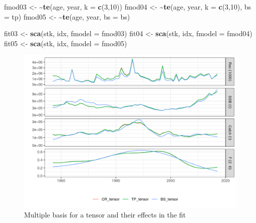 \documentclass[
]{book}
\newenvironment{Shaded}{\begin{snugshade}}{\end{snugshade}}
\newcommand{\AttributeTok}[1]{\textcolor[rgb]{0.13,0.29,0.53}{#1}}
\newcommand{\DecValTok}[1]{\textcolor[rgb]{0.00,0.00,0.81}{#1}}
\newcommand{\ErrorTok}[1]{\textcolor[rgb]{0.64,0.00,0.00}{\textbf{#1}}}
\newcommand{\FunctionTok}[1]{\textcolor[rgb]{0.13,0.29,0.53}{\textbf{#1}}}
\newcommand{\NormalTok}[1]{#1}
\newcommand{\OtherTok}[1]{\textcolor[rgb]{0.56,0.35,0.01}{#1}}
\newcommand{\StringTok}[1]{\textcolor[rgb]{0.31,0.60,0.02}{#1}}
\begin{document}
\begin{Shaded}
\begin{Highlighting}[]
\NormalTok{fmod03 }\OtherTok{\textless{}{-}} \ErrorTok{\textasciitilde{}}\FunctionTok{te}\NormalTok{(age, year, }\AttributeTok{k =} \FunctionTok{c}\NormalTok{(}\DecValTok{3}\NormalTok{,}\DecValTok{10}\NormalTok{))}
\NormalTok{fmod04 }\OtherTok{\textless{}{-}} \ErrorTok{\textasciitilde{}}\FunctionTok{te}\NormalTok{(age, year, }\AttributeTok{k =} \FunctionTok{c}\NormalTok{(}\DecValTok{3}\NormalTok{,}\DecValTok{10}\NormalTok{), }\AttributeTok{bs =} \StringTok{\textquotesingle{}tp\textquotesingle{}}\NormalTok{)}
\NormalTok{fmod05 }\OtherTok{\textless{}{-}} \ErrorTok{\textasciitilde{}}\FunctionTok{te}\NormalTok{(age, year, }\AttributeTok{bs =} \StringTok{\textquotesingle{}bs\textquotesingle{}}\NormalTok{)}

\NormalTok{fit03 }\OtherTok{\textless{}{-}} \FunctionTok{sca}\NormalTok{(stk, idx, }\AttributeTok{fmodel =}\NormalTok{ fmod03)}
\NormalTok{fit04 }\OtherTok{\textless{}{-}} \FunctionTok{sca}\NormalTok{(stk, idx, }\AttributeTok{fmodel =}\NormalTok{ fmod04)}
\NormalTok{fit05 }\OtherTok{\textless{}{-}} \FunctionTok{sca}\NormalTok{(stk, idx, }\AttributeTok{fmodel =}\NormalTok{ fmod05)}
\end{Highlighting}
\end{Shaded}

\begin{figure}
\centering
\includegraphics{_bookdown_files/_main_files/figure-html/te-1.png}
\caption{\label{fig:te}Multiple basis for a tensor and their effects in the fit}
\end{figure}
\end{document}
